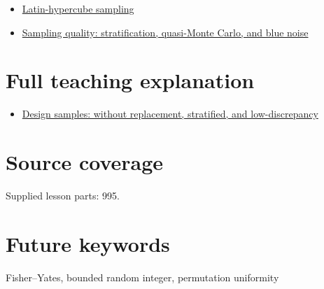 \begin{itemize}
\tightlist
\item
  \hyperref[appendix-1c5e85693a06]{Latin-hypercube sampling}
\item
  \hyperref[appendix-9f693ffd82bc]{Sampling quality: stratification, quasi-Monte Carlo, and blue noise}
\end{itemize}

\section{Full teaching explanation}\label{appendix-184fcc411663-full-teaching-explanation}

\begin{itemize}
\tightlist
\item
  \href{Continuous\%20Notes/Computing\%20Foundations\%20-\%20From\%20Bits\%20to\%20C++\%20and\%20Systems\%20APIs\#Design\%20samples:\%20without\%20replacement,\%20stratified,\%20and\%20low-discrepancy}{Design samples: without replacement, stratified, and low-discrepancy}
\end{itemize}

\section{Source coverage}\label{appendix-184fcc411663-source-coverage}

Supplied lesson parts: 995.

\section{Future keywords}\label{appendix-184fcc411663-future-keywords}

Fisher--Yates, bounded random integer, permutation uniformity

